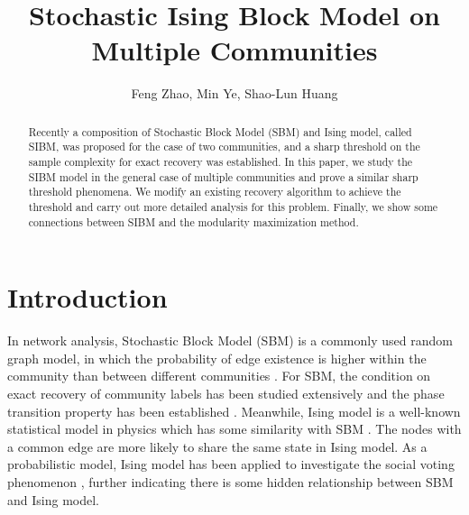 \documentclass{article}
\title{Stochastic Ising Block Model on Multiple Communities}
\author{Feng Zhao, Min Ye, Shao-Lun Huang}
\begin{document}
	\maketitle
\maketitle
{\renewcommand{\thefootnote}{}}



\renewcommand{\thefootnote}{\arabic{footnote}}
\setcounter{footnote}{0}	
\begin{abstract}
	Recently a composition of Stochastic Block Model (SBM) and Ising model, called SIBM, was proposed for the case
	of two communities, and a sharp threshold on the sample complexity for exact recovery was established.
	In this paper, we study the SIBM model in the general case of multiple communities and prove a similar sharp
	threshold phenomena. We modify an existing recovery algorithm to achieve the threshold
	and carry out more detailed analysis for this problem. Finally, we show some connections between SIBM and the modularity maximization method.
\end{abstract}

\section{Introduction}
	In network analysis, Stochastic Block Model (SBM) is a commonly used random graph model, in which the probability of edge existence is higher within the community than between different communities \cite{holland1983stochastic, Abbe17}. For SBM, the condition on exact recovery of community labels has been studied extensively and the phase transition property has been established \cite{abbe2015community, mossel2016}. Meanwhile, Ising model is a well-known statistical model in physics which has some similarity with SBM \cite{ising1925beitrag}. The nodes with a common edge are more likely to share the same state in Ising model\label{key}.
As a probabilistic model, Ising model has been applied to investigate the social voting phenomenon \cite{banerjee2008model}, further indicating there is some hidden relationship between SBM and Ising model.
\end{document}
